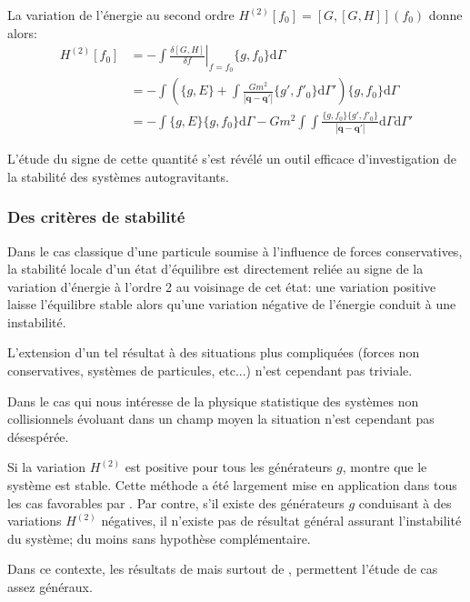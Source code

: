 La variation de l'énergie au second ordre
$
	H^{(2)} [f_{0}] = \left[G, [G,H] \right](f_0)
$
donne alors:
\begin{align}
	H^{(2)}[f_{0}]
	& = - \int \left.\frac{\delta [G,H]}{\delta f}\right|_{f=f_{0}} \{g,f_{0}\} \mathrm{d} \Gamma
	\nonumber \\
	& = - \int \left(
		\{g,E\} + \int \frac{Gm^2}{|\mathbf{q}-\mathbf{q'}|}
		\{g',f'_{0}\} \mathrm{d} \Gamma'
	\right) \{g,f_{0}\} \mathrm{d} \Gamma
	\nonumber \\
	& = - \int \{g,E\} \{g,f_{0}\} \mathrm{d} \Gamma
	- G m^2 \int\!\!\!\int \frac{\{g,f_{0}\}\{g',f'_{0}\}}{|\mathbf{q} - \mathbf{q'}|}
	\mathrm{d} \Gamma \mathrm{d} \Gamma'
\end{align}

L'étude du signe de cette quantité s'est révélé un outil efficace d'investigation de la stabilité des systèmes autogravitants.


\subsubsection{Des critères de stabilité}

Dans le cas classique d'une particule soumise à l'influence de forces conservatives, la stabilité locale d'un état d'équilibre est directement reliée
au signe de la variation d'énergie à l'ordre 2 au voisinage de cet état: une variation positive laisse l'équilibre stable alors qu'une variation
négative de l'énergie conduit à une instabilité.

L'extension d'un tel résultat à des situations plus compliquées (forces non conservatives, systèmes de particules, etc...) n'est cependant pas
triviale.

Dans le cas qui nous intéresse de la physique statistique des systèmes non collisionnels évoluant dans un champ moyen la situation n'est cependant pas
désespérée.

Si la variation $H^{(2)}$ est positive pour tous les générateurs $g$, \cite{bartho} montre que le système est stable. Cette méthode a été
largement mise en application dans tous les cas favorables par \cite{perezaly}. Par contre, s'il existe des générateurs $g$
conduisant à des variations $H^{(2)}$ négatives, il n'existe pas de résultat général assurant l'instabilité du système; du moins sans hypothèse
complémentaire.


Dans ce contexte, les résultats de \cite{blochmarsden} mais surtout de \cite{krechet}, permettent l'étude de cas assez généraux.

